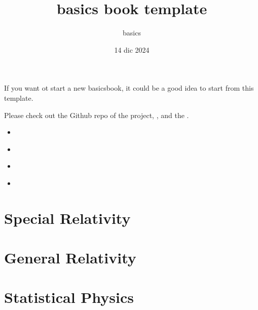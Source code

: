 \documentclass[letterpaper,10pt,italian]{jupyterBook}
\title{basics book template}
\date{14 dic 2024}
\author{basics}
\begin{document}
\pagestyle{empty}
\sphinxmaketitle
\pagestyle{plain}
\sphinxtableofcontents
\pagestyle{normal}
\label{\detokenize{intro::doc}}


\sphinxAtStartPar
If you want ot start a new basics\sphinxhyphen{}book, it could be a good idea to start from this template.

\sphinxAtStartPar
Please check out the Github repo of the project, , and the .
\begin{itemize}
\item {} 
\sphinxAtStartPar
{\hyperref[\detokenize{ch/relativity-special::doc}]{}}

\item {} 
\sphinxAtStartPar
{\hyperref[\detokenize{ch/relativity-general::doc}]{}}

\item {} 
\sphinxAtStartPar
{\hyperref[\detokenize{ch/statistical-mechanics::doc}]{}}

\item {} 
\sphinxAtStartPar
{\hyperref[\detokenize{ch/quantum-mechanics::doc}]{}}

\end{itemize}

\sphinxstepscope


\chapter{Special Relativity}
\label{\detokenize{ch/relativity-special:special-relativity}}\label{\detokenize{ch/relativity-special:relativity-special}}\label{\detokenize{ch/relativity-special::doc}}
\sphinxstepscope


\chapter{General Relativity}
\label{\detokenize{ch/relativity-general:general-relativity}}\label{\detokenize{ch/relativity-general:relativity-general}}\label{\detokenize{ch/relativity-general::doc}}
\sphinxstepscope


\chapter{Statistical Physics}
\label{\detokenize{ch/statistical-mechanics:statistical-physics}}\label{\detokenize{ch/statistical-mechanics:statistical-mechanics}}\label{\detokenize{ch/statistical-mechanics::doc}}
\sphinxstepscope
\end{document}
